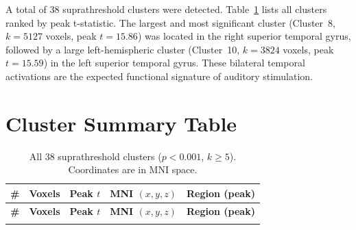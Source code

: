 \documentclass[11pt,a4paper]{article}
\begin{document}
A total of 38 suprathreshold clusters were detected. Table~\ref{tab:clusters} lists all clusters ranked by peak t-statistic. The largest and most significant cluster (Cluster~8, $k = 5127$ voxels, peak $t = 15.86$) was located in the right superior temporal gyrus, followed by a large left-hemispheric cluster (Cluster~10, $k = 3824$ voxels, peak $t = 15.59$) in the left superior temporal gyrus. These bilateral temporal activations are the expected functional signature of auditory stimulation.

\section{Cluster Summary Table}

\begin{longtable}{@{}r r r r l@{}}
\caption{All 38 suprathreshold clusters ($p < 0.001$, $k \geq 5$). Coordinates are in MNI space.}\label{tab:clusters}\\
\toprule
\textbf{\#} & \textbf{Voxels} & \textbf{Peak $t$} & \textbf{MNI $(x, y, z)$} & \textbf{Region (peak)} \\
\midrule
\endfirsthead
\toprule
\textbf{\#} & \textbf{Voxels} & \textbf{Peak $t$} & \textbf{MNI $(x, y, z)$} & \textbf{Region (peak)} \\
\midrule
\endhead
\bottomrule
\endfoot


\end{longtable}
\end{document}
